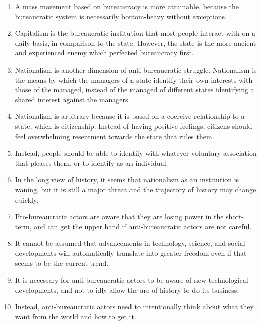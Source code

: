 \documentclass{article}
\begin{document}
\begin{enumerate}
\item A mass movement based on bureaucracy is more attainable, because the bureaucratic system is necessarily bottom-heavy without exceptions.
\item Capitalism is the bureaucratic institution that most people interact with on a daily basis, in comparison to the state. However, the state is the more ancient and experienced enemy which perfected bureaucracy first.
\item Nationalism is another dimension of anti-bureaucratic struggle. Nationalism is the means by which the managers of a state identify their own interests with those of the managed, instead of the managed of different states identifying a shared interest against the managers.
\item Nationalism is arbitrary because it is based on a coercive relationship to a state, which is citizenship. Instead of having positive feelings, citizens should feel overwhelming resentment towards the state that rules them.
\item Instead, people should be able to identify with whatever voluntary association that pleases them, or to identify as an individual.
\item In the long view of history, it seems that nationalism as an institution is waning, but it is still a major threat and the trajectory of history may change quickly.
\item Pro-bureaucratic actors are aware that they are losing power in the short-term, and can get the upper hand if anti-bureaucratic actors are not careful.
\item It cannot be assumed that advancements in technology, science, and social developments will automatically translate into greater freedom even if that seems to be the current trend.
\item It is necessary for anti-bureaucratic actors to be aware of new technological developments, and not to idly allow the arc of history to do its business.
\item Instead, anti-bureaucratic actors need to intentionally think about what they want from the world and how to get it.
\end{enumerate}
\end{document}
